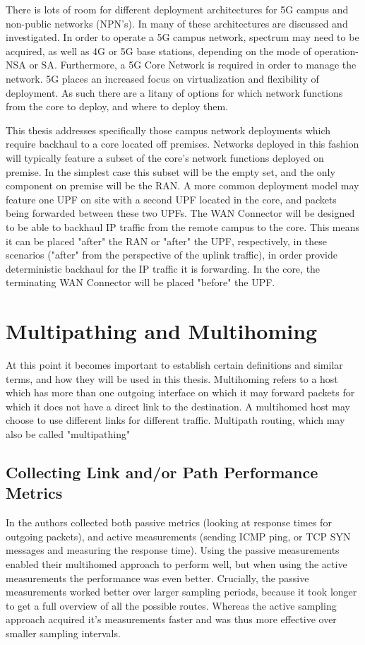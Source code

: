 There is lots of room for different deployment architectures for 5G campus and non-public networks (NPN's). In \cite{prados20215g} many of these architectures are discussed and investigated. In order to operate a 5G campus network, spectrum may need to be acquired, as well as 4G or 5G base stations, depending on the mode of operation- NSA or SA. Furthermore, a 5G Core Network is required in order to manage the network. 5G places an increased focus on virtualization and flexibility of deployment. As such there are a litany of options for which network functions from the core to deploy, and where to deploy them.

This thesis addresses specifically those campus network deployments which require backhaul to a core located off premises. Networks deployed in this fashion will typically feature a subset of the core's network functions deployed on premise. In the simplest case this subset will be the empty set, and the only component on premise will be the RAN. A more common deployment model may feature one UPF on site with a second UPF located in the core, and packets being forwarded between these two UPFs. The WAN Connector will be designed to be able to backhaul IP traffic from the remote campus to the core. This means it can be placed "after" the RAN or "after" the UPF, respectively, in these scenarios ("after" from the perspective of the uplink traffic), in order provide deterministic backhaul for the IP traffic it is forwarding. In the core, the terminating WAN Connector will be placed "before" the UPF.


\section{Multipathing and Multihoming}

At this point it becomes important to establish certain definitions and similar terms, and how they will be used in this thesis. Multihoming refers to a host which has more than one outgoing interface on which it may forward packets for which it does not have a direct link to the destination. A multihomed host may choose to use different links for different traffic. Multipath routing, which may also be called "multipathing"

\subsection{Collecting Link and/or Path Performance Metrics}

In \cite{akella2008performance} the authors collected both passive metrics (looking at response times for outgoing packets), and active measurements (sending ICMP ping, or TCP SYN messages and measuring the response time). Using the passive measurements enabled their multihomed approach to perform well, but when using the active measurements the performance was even better. Crucially, the passive measurements worked better over larger sampling periods, because it took longer to get a full overview of all the possible routes. Whereas the active sampling approach acquired it's measurements faster and was thus more effective over smaller sampling intervals.


